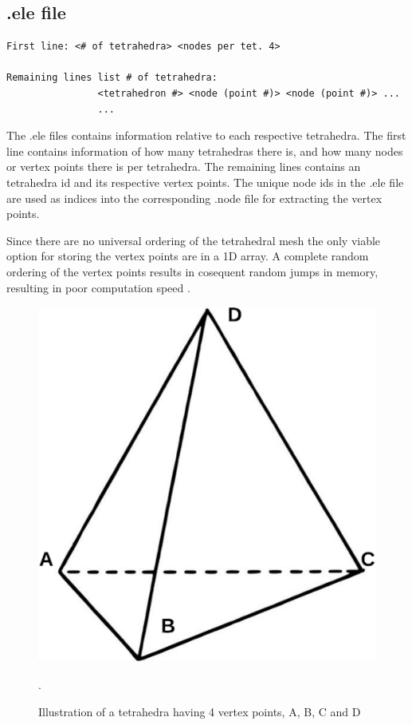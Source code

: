 
\subsection{.ele file}
\begin{lstlisting}[caption=.ele file]
First line:	<# of tetrahedra> <nodes per tet. 4>

Remaining lines list # of tetrahedra:
				<tetrahedron #> <node (point #)> <node (point #)> ... 
				...
\end{lstlisting}
The .ele files contains information relative to each respective tetrahedra. The first line contains information of how many tetrahedras there is, and how many nodes or vertex points there is per tetrahedra. The remaining lines contains an tetrahedra id and its respective vertex points. The unique node ids in the .ele file are used as indices into the corresponding .node file for extracting the vertex points. 

Since there are no universal ordering of the tetrahedral mesh \cite{article4} the only viable option for storing the vertex points are in a 1D array. A complete random ordering of the vertex points results in cosequent random jumps in memory, resulting in poor computation speed \cite{article4}.

\begin{figure}[h]
 \centering 
     \includegraphics[scale=0.4]{bilder/m_tet}
     \caption{Illustration of a tetrahedra having 4 vertex points, A, B, C and D}.
     \label{m_tet.png}
\end{figure}


